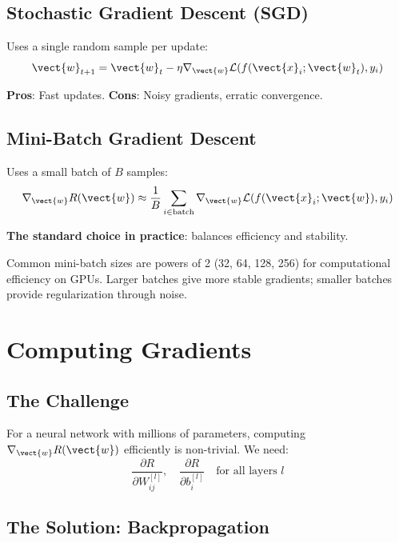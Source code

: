 \subsection{Stochastic Gradient Descent (SGD)}

Uses a single random sample per update:
\[
\vect{w}_{t+1} = \vect{w}_t - \eta \nabla_{\vect{w}} \mathcal{L}(f(\vect{x}_i; \vect{w}_t), y_i)
\]

\textbf{Pros}: Fast updates. \textbf{Cons}: Noisy gradients, erratic convergence.

\subsection{Mini-Batch Gradient Descent}

Uses a small batch of $B$ samples:
\[
\nabla_{\vect{w}} R(\vect{w}) \approx \frac{1}{B} \sum_{i \in \text{batch}} \nabla_{\vect{w}} \mathcal{L}(f(\vect{x}_i; \vect{w}), y_i)
\]

\textbf{The standard choice in practice}: balances efficiency and stability.

\begin{bluebox}
Common mini-batch sizes are powers of 2 (32, 64, 128, 256) for computational efficiency on GPUs. Larger batches give more stable gradients; smaller batches provide regularization through noise.
\end{bluebox}


\section{Computing Gradients}

\subsection{The Challenge}

For a neural network with millions of parameters, computing $\nabla_{\vect{w}} R(\vect{w})$ efficiently is non-trivial. We need:
\[
\frac{\partial R}{\partial W_{ij}^{[l]}}, \quad \frac{\partial R}{\partial b_i^{[l]}} \quad \text{for all layers } l
\]

\subsection{The Solution: Backpropagation}

